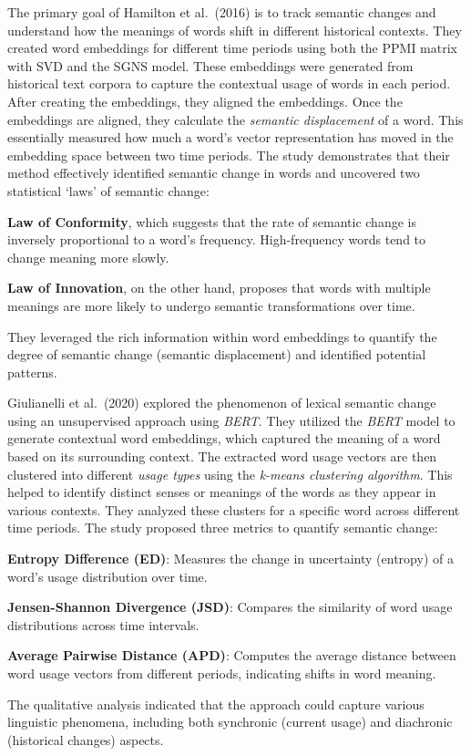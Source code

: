 The primary goal of Hamilton et al.\ (2016) is to track semantic changes and understand how the meanings of words shift in different historical contexts.
They created word embeddings for different time periods using both the PPMI matrix with SVD and the SGNS model.
These embeddings were generated from historical text corpora to capture the contextual usage of words in each period.
After creating the embeddings, they aligned the embeddings.
Once the embeddings are aligned, they calculate the \emph{semantic displacement} of a word.
This essentially measured how much a word's vector representation has moved in the embedding space between two time periods.
The study demonstrates that their method effectively identified semantic change in words and uncovered two statistical `laws' of semantic change:
\begin{packed_enumerate}
    \item \textbf{Law of Conformity}, which suggests that the rate of semantic change is inversely proportional to a word's frequency.
    High-frequency words tend to change meaning more slowly.
    \item \textbf{Law of Innovation}, on the other hand, proposes that words with multiple meanings are more likely to undergo semantic transformations over time.
\end{packed_enumerate}
They leveraged the rich information within word embeddings to quantify the degree of semantic change (semantic displacement) and identified potential patterns.

Giulianelli et al.\ (2020) explored the phenomenon of lexical semantic change using an unsupervised approach using \emph{BERT}.
They utilized the \emph{BERT} model to generate contextual word embeddings, which captured the meaning of a word based on its surrounding context.
The extracted word usage vectors are then clustered into different \emph{usage types} using the \emph{k-means clustering algorithm}.
This helped to identify distinct senses or meanings of the words as they appear in various contexts.
They analyzed these clusters for a specific word across different time periods.
The study proposed three metrics to quantify semantic change:
\begin{packed_enumerate}
    \item \textbf{Entropy Difference (ED)}: Measures the change in uncertainty (entropy) of a word’s usage distribution over time.
    \item \textbf{Jensen-Shannon Divergence (JSD)}: Compares the similarity of word usage distributions across time intervals.
    \item \textbf{Average Pairwise Distance (APD)}: Computes the average distance between word usage vectors from different periods, indicating shifts in word meaning.
\end{packed_enumerate}
The qualitative analysis indicated that the approach could capture various linguistic phenomena, including both synchronic (current usage) and diachronic (historical changes) aspects.

